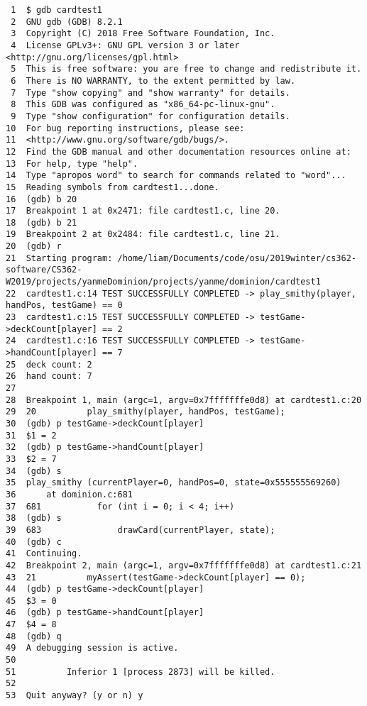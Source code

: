 \documentclass[11pt]{article}
\begin{document}
\begin{verbatim}
 1  $ gdb cardtest1
 2  GNU gdb (GDB) 8.2.1
 3  Copyright (C) 2018 Free Software Foundation, Inc.
 4  License GPLv3+: GNU GPL version 3 or later <http://gnu.org/licenses/gpl.html>                                                                         
 5  This is free software: you are free to change and redistribute it.
 6  There is NO WARRANTY, to the extent permitted by law.
 7  Type "show copying" and "show warranty" for details.
 8  This GDB was configured as "x86_64-pc-linux-gnu".
 9  Type "show configuration" for configuration details.
10  For bug reporting instructions, please see:
11  <http://www.gnu.org/software/gdb/bugs/>.
12  Find the GDB manual and other documentation resources online at:
13  For help, type "help".
14  Type "apropos word" to search for commands related to "word"...
15  Reading symbols from cardtest1...done.
16  (gdb) b 20                                                        
17  Breakpoint 1 at 0x2471: file cardtest1.c, line 20. 
18  (gdb) b 21                         
19  Breakpoint 2 at 0x2484: file cardtest1.c, line 21.
20  (gdb) r                            
21  Starting program: /home/liam/Documents/code/osu/2019winter/cs362-software/CS362-W2019/projects/yanmeDominion/projects/yanme/dominion/cardtest1        
22  cardtest1.c:14 TEST SUCCESSFULLY COMPLETED -> play_smithy(player, handPos, testGame) == 0                                                             
23  cardtest1.c:15 TEST SUCCESSFULLY COMPLETED -> testGame->deckCount[player] == 2                                                                        
24  cardtest1.c:16 TEST SUCCESSFULLY COMPLETED -> testGame->handCount[player] == 7                                                                        
25  deck count: 2                            
26  hand count: 7                      
27                                          
28  Breakpoint 1, main (argc=1, argv=0x7fffffffe0d8) at cardtest1.c:20
29  20          play_smithy(player, handPos, testGame);      
30  (gdb) p testGame->deckCount[player]
31  $1 = 2                        
32  (gdb) p testGame->handCount[player]
33  $2 = 7                                           
34  (gdb) s
35  play_smithy (currentPlayer=0, handPos=0, state=0x555555569260)
36      at dominion.c:681
37  681           for (int i = 0; i < 4; i++)
38  (gdb) s
39  683               drawCard(currentPlayer, state);
40  (gdb) c
41  Continuing.                          
42  Breakpoint 2, main (argc=1, argv=0x7fffffffe0d8) at cardtest1.c:21
43  21          myAssert(testGame->deckCount[player] == 0);
44  (gdb) p testGame->deckCount[player]                                                                                                                   
45  $3 = 0                                                            
46  (gdb) p testGame->handCount[player]                  
47  $4 = 8                                              
48  (gdb) q                                          
49  A debugging session is active.                      
50                                             
51          Inferior 1 [process 2873] will be killed.
52                                                                  
53  Quit anyway? (y or n) y     
\end{verbatim}
\end{document}
